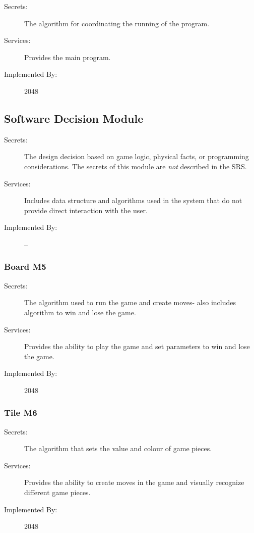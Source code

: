 \documentclass[12pt]{article}
\begin{document}
\begin{description}
\item[Secrets:] The algorithm for coordinating the running of the program.
\item[Services:] Provides the main program.
\item[Implemented By:] 2048
\end{description}

\subsection{Software Decision Module}

\begin{description}
\item[Secrets:] The design decision based on game logic, physical
  facts, or programming considerations. The secrets of this module are
  \emph{not} described in the SRS.
\item[Services:] Includes data structure and algorithms used in the system that
  do not provide direct interaction with the user. 
\item[Implemented By:] --
\end{description}

\subsubsection{Board \textbf{M5}}

\begin{description}
\item[Secrets:] The algorithm used to run the game and create moves- also includes algorithm to win and lose the game.
\item[Services:] Provides the ability to play the game and set parameters to win and lose the game. 
\item[Implemented By:] 2048
\end{description}

\subsubsection{Tile \textbf{M6}}

\begin{description}
\item[Secrets:] The algorithm that sets the value and colour of game pieces.
\item[Services:] Provides the ability to create moves in the game and visually recognize different game pieces.
\item[Implemented By:] 2048
\end{description}
\end{document}
